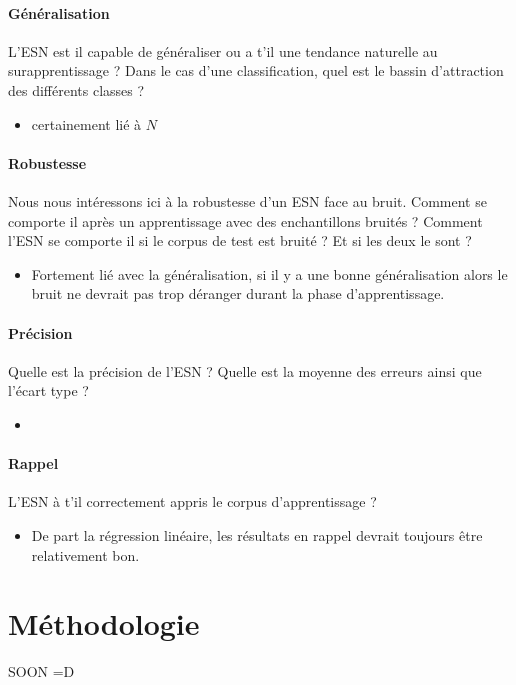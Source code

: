 \documentclass[12pt]{article}
\begin{document}
\paragraph{Généralisation}
L'ESN est il capable de généraliser ou a t'il une tendance naturelle au surapprentissage ? Dans le cas d'une classification, quel est le bassin d'attraction des différents classes ?

\begin{itemize}
\item certainement lié à $N$
\end{itemize}


\paragraph{Robustesse}
Nous nous intéressons ici à la robustesse d'un ESN face au bruit. Comment se comporte il après un apprentissage avec des enchantillons bruités ? Comment l'ESN se comporte il si le corpus de test est bruité ? Et si les deux le sont ?

\begin{itemize}
\item Fortement lié avec la généralisation, si il y a une bonne généralisation alors le bruit ne devrait pas trop déranger durant la phase d'apprentissage.
\end{itemize}


\paragraph{Précision}
Quelle est la précision de l'ESN ? Quelle est la moyenne des erreurs ainsi que l'écart type ?

\begin{itemize}
\item
\end{itemize}

\paragraph{Rappel}
L'ESN à t'il correctement appris le corpus d'apprentissage ?

\begin{itemize}
\item De part la régression linéaire, les résultats en rappel devrait toujours être relativement bon.
\end{itemize}


\section{Méthodologie}

SOON =D
\end{document}
